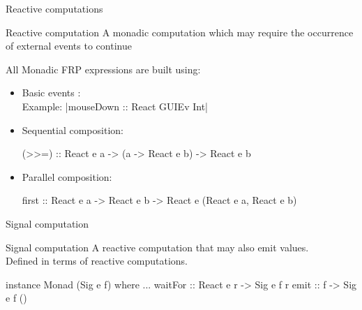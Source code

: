 \documentclass{beamer}
\begin{document}
\begin{frame}{Reactive computations}

\begin{block}{Reactive computation}
A monadic computation which may require the occurrence of external events to continue
\end{block}

All Monadic FRP expressions are built using:
  \begin{itemize}
    \item Basic events :  \\
  Example: |mouseDown :: React GUIEv Int|
    \item Sequential composition:\\ 
 \begin{code}
    (>>=) :: React e a -> (a -> React e b) -> React e b
  \end{code}
\item Parallel composition:  \\
 \begin{code}
 first :: React e a -> React e b -> React e (React e a, React e b)
\end{code}
\end{itemize}

\end{frame}



\begin{frame}{Signal computation}
\begin{block}{Signal computation}
A reactive computation that may also \alert{emit} values.\\
 Defined in terms of reactive computations.
\end{block}
\begin{code}
instance Monad (Sig e f) where ...
waitFor   :: React e r -> Sig e f r
emit      :: f -> Sig e f ()
\end{code}

\end{frame}
\end{document}
